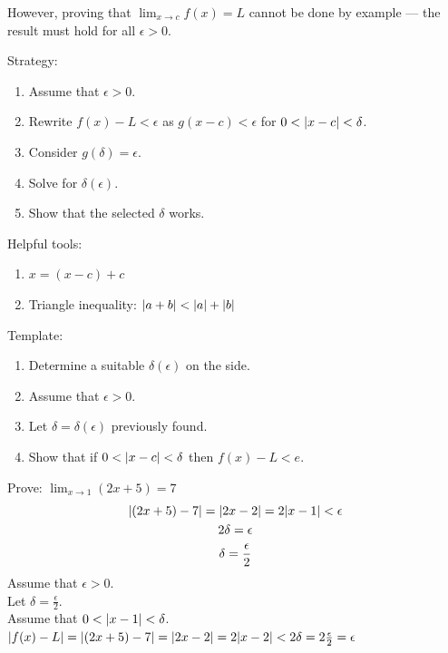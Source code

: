 \documentclass[letterpaper,12pt,fleqn]{article}
\newcommand{\e}{\epsilon}
\renewcommand{\d}{\delta}
\begin{document}
However, proving that \(\displaystyle\lim_{x\to c}f(x)=L\) cannot be done by example --- the result must hold for all
\(\e>0\).

Strategy:
\begin{enumerate}
\item Assume that \(\e>0\).
\item Rewrite \(f(x)-L<\e\) as \(g(x-c)<\e\) for \(0<\abs{x-c}<\d\).
\item Consider \(g(\d)=\e\).
\item Solve for \(\d(\e)\).
\item Show that the selected \(\d\) works.
\end{enumerate}

Helpful tools:
\begin{enumerate}
\item \(x=(x-c)+c\)
\item Triangle inequality: \(\lvert a+b\rvert<\lvert a\rvert+\lvert b\rvert\)
\end{enumerate}

Template:
\begin{enumerate}[start=0]
\item Determine a suitable \(\d(\e)\) on the side.
\item Assume that \(\e>0\).
\item Let \(\d=\d(\e)\) previously found.
\item Show that if \(0<\abs{x-c}<\d\) then \(f(x)-L<e\).
\end{enumerate}

\begin{example}
  Prove: \(\displaystyle\lim_{x\to1}(2x+5)=7\)
  \begin{gather*}
    \abs{(2x+5)-7}=\abs{2x-2}=2\abs{x-1}<\e \\
    2\d=\e \\
    \d=\frac{\e}{2}
  \end{gather*}
  Assume that \(\e>0\). \\
  Let \(\d=\frac{\e}{2}\). \\
  Assume that \(0<\abs{x-1}<\d\). \\
  \(\abs{f(x)-L}=\abs{(2x+5)-7}=\abs{2x-2}=2\abs{x-2}<2\d=2\frac{\e}{2}=\e\)
\end{example}
\end{document}
